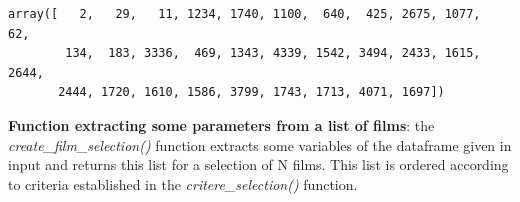             \begin{tcolorbox}[breakable, boxrule=.5pt, size=fbox, pad at break*=1mm, opacityfill=0]
\begin{Verbatim}[commandchars=\\\{\}]
array([   2,   29,   11, 1234, 1740, 1100,  640,  425, 2675, 1077,   62,
        134,  183, 3336,  469, 1343, 4339, 1542, 3494, 2433, 1615, 2644,
       2444, 1720, 1610, 1586, 3799, 1743, 1713, 4071, 1697])
\end{Verbatim}
\end{tcolorbox}
        
    \textbf{Function extracting some parameters from a list of films}: the
\emph{create\_film\_selection()} function extracts some variables of the
dataframe given in input and returns this list for a selection of N
films. This list is ordered according to criteria established in the
\emph{critere\_selection()} function.


